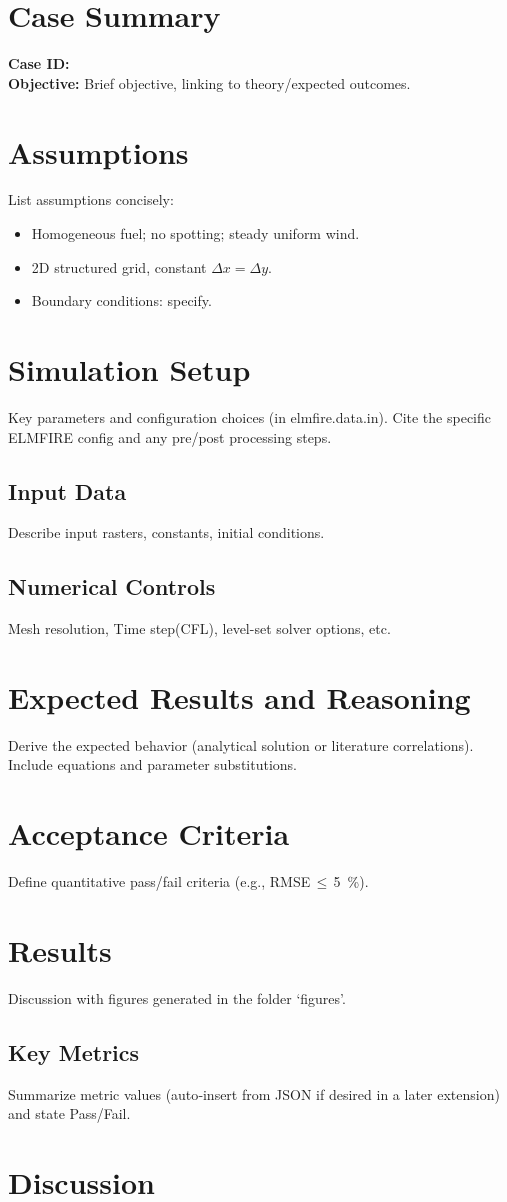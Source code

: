 \documentclass[11pt]{article}
\begin{document}
\maketitle


\section*{Case Summary}
\textbf{Case ID:} \CaseID\\
\textbf{Objective:} Brief objective, linking to theory/expected outcomes.


\section{Assumptions}
List assumptions concisely:
\begin{itemize}[nosep]
\item Homogeneous fuel; no spotting; steady uniform wind.
\item 2D structured grid, constant \(\Delta x = \Delta y\).
\item Boundary conditions: specify.
\end{itemize}


\section{Simulation Setup}
Key parameters and configuration choices (in elmfire.data.in). Cite the specific ELMFIRE config and any pre/post processing steps.


\subsection{Input Data}
Describe input rasters, constants, initial conditions.


\subsection{Numerical Controls}
Mesh resolution, Time step(CFL), level-set solver options, etc.


\section{Expected Results and Reasoning}
Derive the expected behavior (analytical solution or literature correlations). Include equations and parameter substitutions.


\section{Acceptance Criteria}
Define quantitative pass/fail criteria (e.g., RMSE\,\(\leq\)\,\SI{5}{\percent}).


\section{Results}
Discussion with figures generated in the folder `figures'. 


\subsection{Key Metrics}
Summarize metric values (auto‑insert from JSON if desired in a later extension) and state Pass/Fail.


\section{Discussion}
\end{document}
